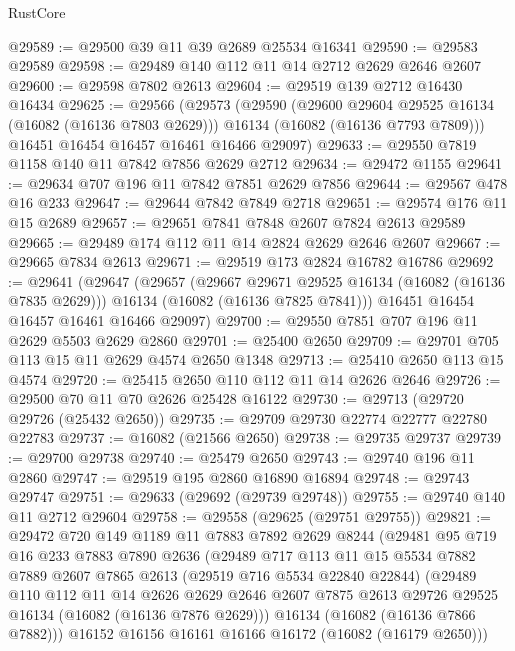 \begin{lexlean}{RustCore}
\begin{coremodule}
@29589 := @29500 @39 @11 @39 @2689 @25534 @16341
@29590 := @29583 @29589
@29598 := @29489 @140 @112 @11 @14 @2712 @2629 @2646 @2607
@29600 := @29598 @7802 @2613
@29604 := @29519 @139 @2712 @16430 @16434
@29625 := @29566
    (@29573
      (@29590
        (@29600 @29604 @29525 @16134 (@16082 (@16136 @7803 @2629)))
        @16134
        (@16082 (@16136 @7793 @7809)))
      @16451
      @16454
      @16457
      @16461
      @16466
      @29097)
@29633 := @29550 @7819 @1158 @140 @11 @7842 @7856 @2629 @2712
@29634 := @29472 @1155
@29641 := @29634 @707 @196 @11 @7842 @7851 @2629 @7856
@29644 := @29567 @478 @16 @233
@29647 := @29644 @7842 @7849 @2718
@29651 := @29574 @176 @11 @15 @2689
@29657 := @29651 @7841 @7848 @2607 @7824 @2613 @29589
@29665 := @29489 @174 @112 @11 @14 @2824 @2629 @2646 @2607
@29667 := @29665 @7834 @2613
@29671 := @29519 @173 @2824 @16782 @16786
@29692 := @29641
    (@29647
      (@29657
        (@29667 @29671 @29525 @16134 (@16082 (@16136 @7835 @2629)))
        @16134
        (@16082 (@16136 @7825 @7841)))
      @16451
      @16454
      @16457
      @16461
      @16466
      @29097)
@29700 := @29550 @7851 @707 @196 @11 @2629 @5503 @2629 @2860
@29701 := @25400 @2650
@29709 := @29701 @705 @113 @15 @11 @2629 @4574 @2650 @1348
@29713 := @25410 @2650 @113 @15 @4574
@29720 := @25415 @2650 @110 @112 @11 @14 @2626 @2646
@29726 := @29500 @70 @11 @70 @2626 @25428 @16122
@29730 := @29713 (@29720 @29726 (@25432 @2650))
@29735 := @29709 @29730 @22774 @22777 @22780 @22783
@29737 := @16082 (@21566 @2650)
@29738 := @29735 @29737
@29739 := @29700 @29738
@29740 := @25479 @2650
@29743 := @29740 @196 @11 @2860
@29747 := @29519 @195 @2860 @16890 @16894
@29748 := @29743 @29747
@29751 := @29633 (@29692 (@29739 @29748))
@29755 := @29740 @140 @11 @2712 @29604
@29758 := @29558 (@29625 (@29751 @29755))
@29821 := @29472
    @720
    @149
    @1189
    @11
    @7883
    @7892
    @2629
    @8244
    (@29481
      @95
      @719
      @16
      @233
      @7883
      @7890
      @2636
      (@29489
        @717
        @113
        @11
        @15
        @5534
        @7882
        @7889
        @2607
        @7865
        @2613
        (@29519 @716 @5534 @22840 @22844)
        (@29489
          @110
          @112
          @11
          @14
          @2626
          @2629
          @2646
          @2607
          @7875
          @2613
          @29726
          @29525
          @16134
          (@16082 (@16136 @7876 @2629)))
        @16134
        (@16082 (@16136 @7866 @7882)))
      @16152
      @16156
      @16161
      @16166
      @16172
      (@16082 (@16179 @2650)))

\end{coremodule}
\end{lexlean}

